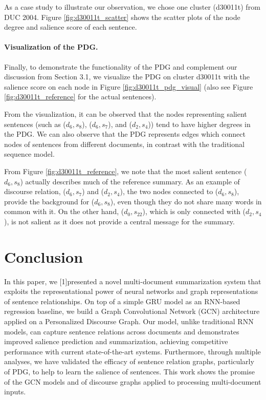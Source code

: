 \documentclass[11pt,a4paper]{article}
\begin{document}
As a case study to illustrate our observation, we chose one cluster (d30011t) from DUC 2004.
Figure \ref{fig:d30011t_scatter} shows the scatter plots of the node degree and salience score of each sentence.

\paragraph{Visualization of the PDG.}
Finally, to demonstrate the functionality of the PDG and complement our discussion from Section 3.1, we visualize the PDG on cluster d30011t with the salience score on each node in Figure \ref{fig:d30011t_pdg_visual} (also see Figure \ref{fig:d30011t_reference} for the actual sentences).

From the visualization, it can be observed that the nodes representing salient sentences (such as ($d_6,s_8$), ($d_6,s_7$), and ($d_2,s_4$)) tend to have higher degrees in the PDG. We can also observe that the PDG represents edges which connect nodes of sentences from different documents, in contrast with the traditional sequence model.

From Figure \ref{fig:d30011t_reference}, we note that the most salient sentence ($d_6,s_8$) actually describes much of the reference summary. As an example of discourse relation,
($d_6,s_7$) and ($d_2,s_4$), the two nodes connected to ($d_6,s_8$), provide the background for ($d_6,s_8$), even though they do not share many words in common with it.
On the other hand,
($d_0,s_{22}$), which is only connected with ($d_2,s_4$), is not salient as it does not provide a central message for the summary.





 



\section{Conclusion}
In this paper, we \scalebox{0.96}[1]{presented} a novel multi-document summarization system that exploits the representational power of neural networks and graph representations of sentence relationships. 
On top of a simple GRU model as an RNN-based regression baseline, we build a Graph Convolutional Network (GCN) architecture applied on a Personalized Discourse Graph.
Our model, unlike traditional RNN models, 
can capture sentence relations across documents
and demonstrates improved salience prediction and summarization,
achieving competitive performance with current state-of-the-art systems.
Furthermore, through multiple analyses, we have validated the efficacy of sentence relation graphs, particularly of PDG, to help to learn the salience of sentences.
This work shows the promise of the GCN models and of discourse graphs applied to processing multi-document inputs.
\end{document}
